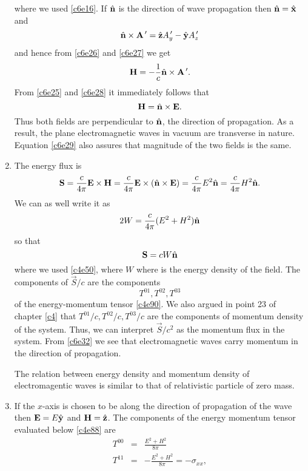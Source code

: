 \begin{enumerate}
\begin{equation}
\end{equation}
where we used \eqref{c6e16}. If $\hat{\mathbf{n}}$ is the direction of wave propagation then
$\hat{\mathbf{n}} = \hat{\mathbf{x}}$ and 
\begin{equation}\label{c6e27}
\hat{\mathbf{n}}\times\mathbf{A}^{\,\prime} = \hat{\mathbf{z}}A^{\,\prime}_y - \hat{\mathbf{y}}A^{\,\prime}_z
\end{equation}
and hence from \eqref{c6e26} and \eqref{c6e27} we get
\begin{equation}\label{c6e28}
\mathbf{H} = -\frac{1}{c}\hat{\mathbf{n}}\times\mathbf{A}^{\,\prime}.
\end{equation}
From \eqref{c6e25} and \eqref{c6e28} it immediately follows that
\begin{equation}\label{c6e29}
\mathbf{H} = \hat{\mathbf{n}}\times\mathbf{E}.
\end{equation}
Thus both fields are perpendicular to $\hat{\mathbf{n}}$, the direction of propagation. As a 
result, the plane electromagnetic waves in vacuum are transverse in nature. 
Equation \eqref{c6e29} also assures that magnitude of the two fields is the same.

\item The energy flux is
\begin{equation}\label{c6e30}
\mathbf{S} = \frac{c}{4\pi}\mathbf{E}\times\mathbf{H} = 
\frac{c}{4\pi}\mathbf{E}\times(\hat{\mathbf{n}}\times\mathbf{E}) = 
\frac{c}{4\pi}E^2\hat{\mathbf{n}} = \frac{c}{4\pi}H^2\hat{\mathbf{n}}.
\end{equation}
We can as well write it as 
\begin{equation}\label{c6e31}
2W = \frac{c}{4\pi}(E^2 + H^2)\hat{\mathbf{n}}
\end{equation}
so that
\begin{equation}\label{c6e32}
\mathbf{S} = cW\hat{\mathbf{n}}
\end{equation}
where we used \eqref{c4e50}, where $W$ where is the energy density of the field.
The components of $\vec{S}/c$ are the components 
\[
T^{01}, T^{02}, T^{03}
\]
of the energy-momentum tensor \eqref{c4e90}. We also argued in point 23 of chapter
\ref{c4} that $T^{01}/c, T^{02}/c, T^{03}/c$ are the components of momentum 
density of the system. Thus, we can interpret $\vec{S}/c^2$ as the momentum flux
in the system. From \eqref{c6e32} we see that electromagnetic waves carry momentum
in the direction of propagation.

The relation between energy density and momentum density of electromagentic 
waves is similar to that of relativistic particle of zero mass.

\item If the $x$-axis is chosen to be along the direction of propagation of
the wave then $\mathbf{E} = E\hat{\mathbf{y}}$ and $\mathbf{H} = \hat{\mathbf{z}}$. The components of the
energy momentum tensor evaluated below \eqref{c4e88} are
\begin{eqnarray}
T^{00} &=& \frac{E^2 + H^2}{8\pi} \label{c6e33} \\
T^{11} &=& -\frac{E^2 + H^2}{8\pi} = -\sigma_{xx} \label{c6e34},
\end{eqnarray}


\end{enumerate}
